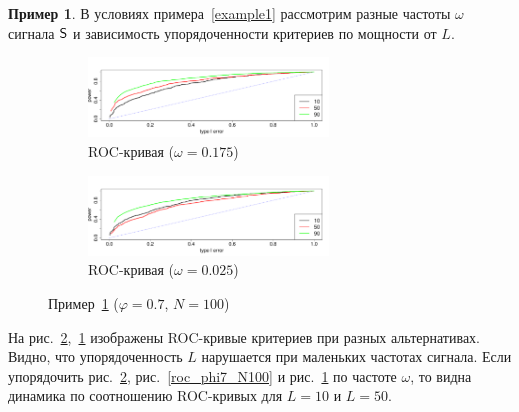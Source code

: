 \documentclass[specialist,
substylefile = spbu_report.rtx,
subf,href,colorlinks=true, 12pt]{disser}
\theoremstyle{definition}
\newtheorem{example}{Пример}
\begin{document}
\begin{example}\label{example4}
	В условиях примера~\ref{example1} рассмотрим разные частоты $\omega$ сигнала $\mathsf{S}$ и зависимость упорядоченности критериев по мощности от $L$.
	\begin{figure}[h!]
		\captionsetup[subfigure]{justification=Centering}
		\begin{subfigure}[t]{\textwidth}
			\centering
			\includegraphics[width=0.7\textwidth]{img/roc_omega0175}
			\caption{ROC-кривая ($\omega=0.175$)}
			\label{roc_omega0025}
		\end{subfigure}
		\begin{subfigure}[t]{\textwidth}
			\centering
			\includegraphics[width=0.7\textwidth]{img/roc_omega0025}
			\caption{ROC-кривая ($\omega=0.025$)}
			\label{roc_omega0175}
		\end{subfigure}
	\label{fig:example4}
	\caption{Пример~\ref{example4} ($\varphi=0.7$, $N=100$)}
	\end{figure}
	На рис.~\ref{roc_omega0175},~\ref{roc_omega0025} изображены ROC-кривые критериев при разных альтернативах. Видно, что упорядоченность $L$ нарушается при маленьких частотах сигнала. Если упорядочить рис.~\ref{roc_omega0175}, рис.~\ref{roc_phi7_N100} и рис.~\ref{roc_omega0025} по частоте $\omega$, то видна динамика по соотношению ROC-кривых для $L=10$ и $L=50$.
\end{example}
\end{document}
